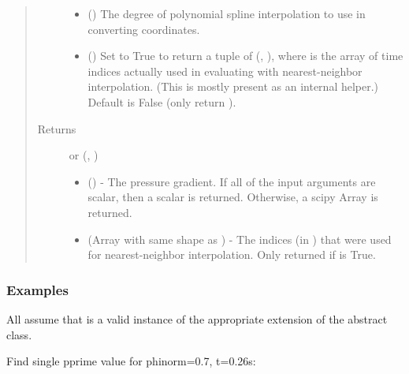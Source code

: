 \documentclass[letterpaper,10pt,english]{sphinxmanual}
\begin{document}
\begin{fulllineitems}
\begin{fulllineitems}
\begin{quote}
\begin{description}
\begin{itemize}
\item {} 
 () \textendash{} The degree of polynomial spline interpolation to
use in converting coordinates.

\item {} 
 () \textendash{} Set to True to return a tuple of (,
), where  is the array of time indices
actually used in evaluating  with nearest-neighbor
interpolation. (This is mostly present as an internal helper.)
Default is False (only return ).

\end{itemize}

\item[{Returns}] \leavevmode

 or (, )
\begin{itemize}
\item {} 
 () - The pressure gradient. If
all of the input arguments are scalar, then a scalar is returned.
Otherwise, a scipy Array is returned.

\item {} 
 (Array with same shape as ) - The indices
(in ) that were used for
nearest-neighbor interpolation. Only returned if  is
True.

\end{itemize}


\end{description}\end{quote}
\subsubsection*{Examples}

All assume that  is a valid instance of the appropriate
extension of the {\hyperref[\detokenize{eqtools:eqtools.core.Equilibrium}]{}} abstract class.

Find single pprime value for phinorm=0.7, t=0.26s:


\end{fulllineitems}
\end{fulllineitems}
\end{document}
